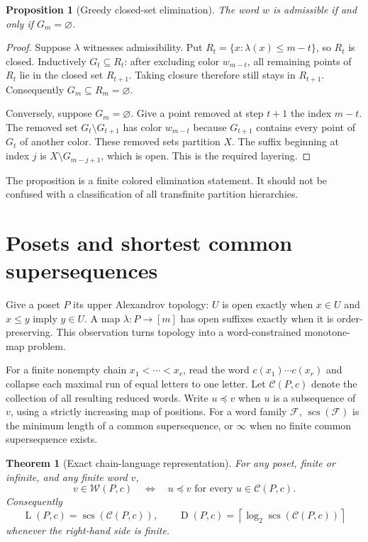 \documentclass[11pt,letterpaper]{article}
\numberwithin{equation}{section}
\newtheorem{theorem}{Theorem}[section]
\newtheorem{proposition}[proposition]{Proposition}
\theoremstyle{definition}
\theoremstyle{remark}
\theoremstyle{definition}
\newcommand{\ceil}[1]{\left\lceil#1\right\rceil}
\newcommand{\W}{\mathcal W}
\newcommand{\C}{\mathcal C}
\newcommand{\scs}{\operatorname{scs}}
\newcommand{\depth}{\operatorname{D}}
\newcommand{\layers}{\operatorname{L}}
\newcommand{\subseq}{\preccurlyeq}
\begin{document}
\begin{proposition}[Greedy closed-set elimination]\label{fo:prop:closure}
The word $w$ is admissible if and only if $G_m=\varnothing$.
\end{proposition}
\begin{proof}
Suppose $\lambda$ witnesses admissibility. Put
$R_t=\{x:\lambda(x)\le m-t\}$, so $R_t$ is closed. Inductively $G_t\subseteq
R_t$: after excluding color $w_{m-t}$, all remaining points of $R_t$ lie in the
closed set $R_{t+1}$. Taking closure therefore still stays in $R_{t+1}$.
Consequently $G_m\subseteq R_m=\varnothing$.

Conversely, suppose $G_m=\varnothing$. Give a point removed at step $t+1$ the
index $m-t$. The removed set $G_t\setminus G_{t+1}$ has color $w_{m-t}$ because
$G_{t+1}$ contains every point of $G_t$ of another color. These removed sets
partition $X$. The suffix beginning at index $j$ is
$X\setminus G_{m-j+1}$, which is open. This is the required layering.
\end{proof}

The proposition is a finite colored elimination statement. It should not be
confused with a classification of all transfinite partition hierarchies.

\section{Posets and shortest common supersequences}
\label{fo:sec:posets}

Give a poset $P$ its upper Alexandrov topology: $U$ is open exactly when
$x\in U$ and $x\le y$ imply $y\in U$. A map $\lambda:P\to[m]$ has open suffixes
exactly when it is order-preserving. This observation turns topology into a
word-constrained monotone-map problem.

For a finite nonempty chain $x_1<\cdots<x_r$, read the word
$c(x_1)\cdots c(x_r)$ and collapse each maximal run of equal letters to one
letter. Let $\C(P,c)$ denote the collection of all resulting reduced words.
Write $u\subseq v$ when $u$ is a subsequence of $v$, using a strictly increasing
map of positions. For a word family $\mathcal F$, $\scs(\mathcal F)$ is the
minimum length of a common supersequence, or $\infty$ when no finite common
supersequence exists.

\begin{theorem}[Exact chain-language representation]\label{fo:thm:chains}
For any poset, finite or infinite, and any finite word $v$,
\begin{equation}\label{fo:eq:profile-chain}
 v\in\W(P,c)
 \quad\Longleftrightarrow\quad
 u\subseq v\text{ for every }u\in\C(P,c).
\end{equation}
Consequently
\begin{equation}\label{fo:eq:scs}
 \layers(P,c)=\scs(\C(P,c)),\qquad
 \depth(P,c)=\ceil{\log_2\scs(\C(P,c))}
\end{equation}
whenever the right-hand side is finite.
\end{theorem}
\end{document}
